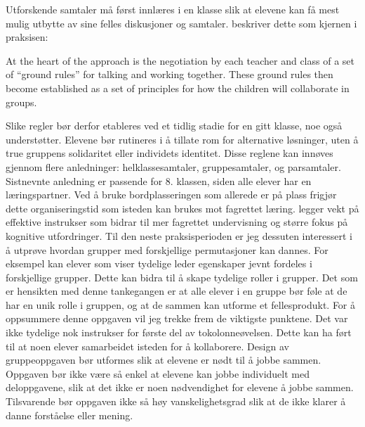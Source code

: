 \documentclass[main.tex]{subfiles}
\begin{document}
\newline
\newline
Utforskende samtaler må først innlæres i en klasse slik at elevene kan få mest mulig
utbytte av sine felles diskusjoner og samtaler.  beskriver dette som kjernen i 
praksisen:
\begin{displayquote}
At the heart of the approach is the negotiation by each teacher and class of a set of ``ground
rules'' for talking and working together. These ground rules then become established as a set of 
principles for how the children will collaborate in groups.
\end{displayquote}
Slike regler bør derfor etableres ved et tidlig stadie for en gitt klasse, noe 
også understøtter. Elevene bør rutineres i å tillate rom for alternative løsninger, uten å true 
gruppens solidaritet eller individets identitet. Disse reglene kan innøves gjennom flere 
anledninger: helklassesamtaler, gruppesamtaler, og parsamtaler. Sistnevnte anledning er passende
for 8. klassen, siden alle elever har en læringspartner. Ved å bruke bordplasseringen som allerede 
er på plass frigjør dette organiseringstid som isteden kan brukes mot fagrettet læring. 
 legger vekt på effektive instrukser som bidrar til mer fagrettet undervisning og 
større fokus på kognitive utfordringer.
\newline
\newline
Til den neste praksisperioden er jeg dessuten interessert i å utprøve hvordan grupper med forskjellige 
permutasjoner kan dannes.  For eksempel kan elever som viser tydelige leder egenskaper jevnt fordeles i 
forskjellige grupper. Dette kan bidra til å skape tydelige roller i grupper. Det som er hensikten med denne 
tankegangen er at alle elever i en gruppe bør føle at de har en unik rolle i gruppen, og at de sammen kan 
utforme et fellesprodukt.
\newline
\newline
For å oppsummere denne oppgaven vil jeg trekke frem de viktigste punktene. Det var ikke tydelige 
nok instrukser for første del av tokolonneøvelsen. Dette kan ha ført til at noen elever 
samarbeidet isteden for å kollaborere. Design av gruppeoppgaven bør utformes slik at elevene er 
nødt til å jobbe sammen. Oppgaven bør ikke være så enkel at elevene kan jobbe individuelt med 
deloppgavene, slik at det ikke er noen nødvendighet for elevene å jobbe sammen. Tilsvarende 
bør oppgaven ikke så høy vanskelighetsgrad slik at de ikke klarer å danne forståelse eller mening. 
\end{document}

